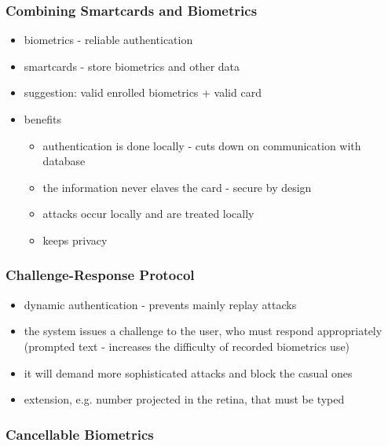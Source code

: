 \documentclass[paper=a4, fontsize=11pt]{scrartcl} %
\numberwithin{equation}{section} %
\numberwithin{figure}{section} %
\numberwithin{table}{section} %
\begin{document}
\subsubsection{Combining Smartcards and Biometrics}

\begin{itemize}
\item biometrics - reliable authentication
\item smartcards - store biometrics and other data
\item suggestion: valid enrolled biometrics + valid card
\item benefits
\begin{itemize}
\item authentication is done locally - cuts down on communication with database
\item the information never elaves the card - secure by design
\item attacks occur locally and are treated locally
\item keeps privacy
\end{itemize}
\end{itemize}

\subsubsection{Challenge-Response Protocol}

\begin{itemize}
\item dynamic authentication - prevents mainly replay attacks
\item the system issues a challenge to the user, who must respond appropriately (prompted text - increases the difficulty of recorded biometrics use)
\item it will demand more sophisticated attacks and block the casual ones
\item extension, e.g. number projected in the retina, that must be typed
\end{itemize}

\subsubsection{Cancellable Biometrics}
\end{document}
